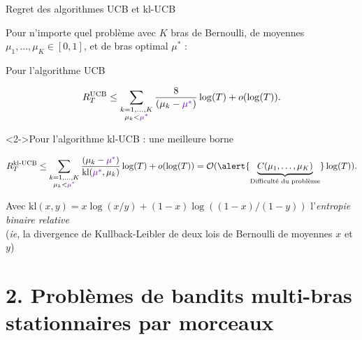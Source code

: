 \documentclass[11pt,french,ignorenonframetext,]{beamer}
\begin{document}
\begin{frame}{Regret des algorithmes UCB et kl-UCB}

  Pour n'importe quel problème avec $K$ bras de Bernoulli, de moyennes $\mu_1,\dots,\mu_K \in[0,1]$, et de \textcolor{deeppurple}{bras optimal $\mu^*$} :

  \begin{exampleblock}{Pour l'algorithme UCB}
    \begin{small}
      \[ R_T^{\mathrm{UCB}} \leq \sum_{\substack{k=1,\dots,K \\ \mu_k < \textcolor{deeppurple}{\mu^*}}} \frac{8}{(\mu_k - \textcolor{deeppurple}{\mu^*})} \log(T) + o(\log(T)). \]
    \end{small}%
  \end{exampleblock}

  \begin{exampleblock}<2->{Pour l'algorithme kl-UCB : une meilleure borne}
    \begin{small}
      \[ R_T^{\mathrm{kl}\text{-}\mathrm{UCB}} \leq \sum_{\substack{k=1,\dots,K \\ \mu_k < \textcolor{deeppurple}{\mu^*}}} \frac{(\mu_k - \textcolor{deeppurple}{\mu^*})}{\mathrm{kl}(\textcolor{deeppurple}{\mu^*}, \mu_k)} \log(T) + o(\log(T)) = \mathcal{O}( \alert{\underbrace{C(\mu_1,\dots,\mu_K)}_{\text{Difficulté du problème}}} \log(T) ). \]
    \end{small}%
    \begin{footnotesize}
      Avec $\mathrm{kl}(x, y) = x \log(x/y) + (1-x) \log((1-x)/(1-y))$ l'\emph{entropie binaire relative}\\
      (\emph{ie}, la divergence de Kullback-Leibler de deux lois de Bernoulli de moyennes $x$ et $y$)
    \end{footnotesize}%
  \end{exampleblock}

\end{frame}


\section{\hfill{}2. Problèmes de bandits multi-bras stationnaires par morceaux\hfill{}}
\end{document}
